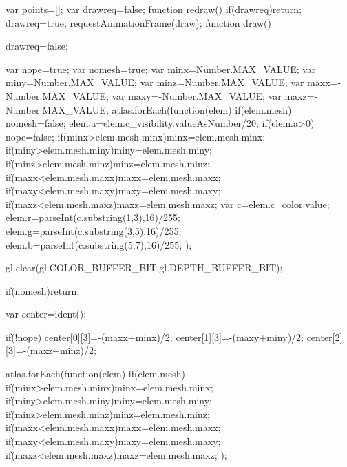             var points=[];
            var drawreq=false;
            function redraw(){
                if(drawreq)return;
                drawreq=true;
                requestAnimationFrame(draw);
            }
            function draw(){
                drawreq=false;
                
                var nope=true;
                var nomesh=true;
                var minx=Number.MAX_VALUE;
                var miny=Number.MAX_VALUE;
                var minz=Number.MAX_VALUE;
                var maxx=-Number.MAX_VALUE;
                var maxy=-Number.MAX_VALUE;
                var maxz=-Number.MAX_VALUE;
                atlas.forEach(function(elem){
                    if(elem.mesh){
                        nomesh=false;
                        elem.a=elem.c_visibility.valueAsNumber/20;
                        if(elem.a>0){
                            nope=false;
                            if(minx>elem.mesh.minx)minx=elem.mesh.minx;
                            if(miny>elem.mesh.miny)miny=elem.mesh.miny;
                            if(minz>elem.mesh.minz)minz=elem.mesh.minz;
                            if(maxx<elem.mesh.maxx)maxx=elem.mesh.maxx;
                            if(maxy<elem.mesh.maxy)maxy=elem.mesh.maxy;
                            if(maxz<elem.mesh.maxz)maxz=elem.mesh.maxz;
                            var c=elem.c_color.value;
                            elem.r=parseInt(c.substring(1,3),16)/255;
                            elem.g=parseInt(c.substring(3,5),16)/255;
                            elem.b=parseInt(c.substring(5,7),16)/255;
                        }
                    }
                });
                
                gl.clear(gl.COLOR_BUFFER_BIT|gl.DEPTH_BUFFER_BIT);
                
                if(nomesh)return;
                
                var center=ident();
                
                if(!nope){
                    center[0][3]=-(maxx+minx)/2;
                    center[1][3]=-(maxy+miny)/2;
                    center[2][3]=-(maxz+minz)/2;
                }
                
                atlas.forEach(function(elem){
                    if(elem.mesh){
                        if(minx>elem.mesh.minx)minx=elem.mesh.minx;
                        if(miny>elem.mesh.miny)miny=elem.mesh.miny;
                        if(minz>elem.mesh.minz)minz=elem.mesh.minz;
                        if(maxx<elem.mesh.maxx)maxx=elem.mesh.maxx;
                        if(maxy<elem.mesh.maxy)maxy=elem.mesh.maxy;
                        if(maxz<elem.mesh.maxz)maxz=elem.mesh.maxz;
                    }
                });

}
